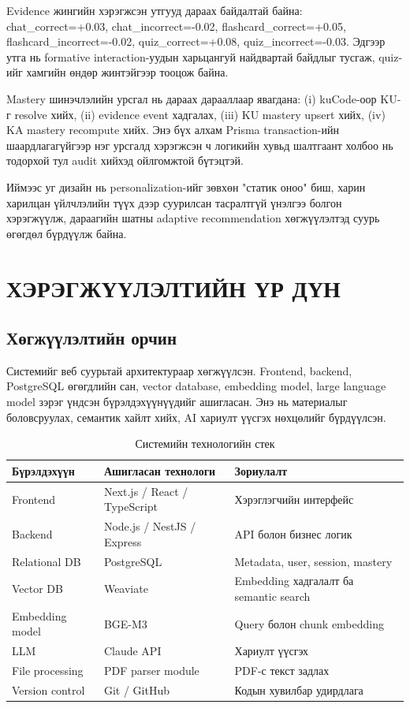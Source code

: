 \documentclass[12pt,A4]{report}
\newcommand{\eng}[1]{#1}
\begin{document}
Evidence жингийн хэрэгжсэн утгууд дараах байдалтай байна: \eng{chat\_correct}=+0.03, \eng{chat\_incorrect}=-0.02, \eng{flashcard\_correct}=+0.05, \eng{flashcard\_incorrect}=-0.02, \eng{quiz\_correct}=+0.08, \eng{quiz\_incorrect}=-0.03. Эдгээр утга нь formative interaction-уудын харьцангуй найдвартай байдлыг тусгаж, quiz-ийг хамгийн өндөр жинтэйгээр тооцож байна.

Mastery шинэчлэлийн урсгал нь дараах дарааллаар явагдана: (i) kuCode-оор KU-г resolve хийх, (ii) evidence event хадгалах, (iii) KU mastery upsert хийх, (iv) KA mastery recompute хийх. Энэ бүх алхам \eng{Prisma transaction}-ийн шаардлагагүйгээр нэг урсгалд хэрэгжсэн ч логикийн хувьд шалтгаант холбоо нь тодорхой тул audit хийхэд ойлгомжтой бүтэцтэй.

Иймээс уг дизайн нь personalization-ийг зөвхөн "статик оноо" биш, харин харилцан үйлчлэлийн түүх дээр суурилсан тасралтгүй үнэлгээ болгон хэрэгжүүлж, дараагийн шатны adaptive recommendation хөгжүүлэлтэд суурь өгөгдөл бүрдүүлж байна.


\chapter{ХЭРЭГЖҮҮЛЭЛТИЙН ҮР ДҮН}

\section{Хөгжүүлэлтийн орчин}
Системийг веб суурьтай архитектураар хөгжүүлсэн. Frontend, backend, PostgreSQL өгөгдлийн сан, vector database, embedding model, large language model зэрэг үндсэн бүрэлдэхүүнүүдийг ашигласан. Энэ нь материалыг боловсруулах, семантик хайлт хийх, AI хариулт үүсгэх нөхцөлийг бүрдүүлсэн.

\begin{table}[H]
\centering
\caption{Системийн технологийн стек}
\label{tab:tech-stack}
\begin{tabularx}{\textwidth}{>{\raggedright\arraybackslash}p{3.2cm} >{\raggedright\arraybackslash}p{5.2cm} >{\raggedright\arraybackslash}X}
\toprule
\textbf{Бүрэлдэхүүн} & \textbf{Ашигласан технологи} & \textbf{Зориулалт} \\
\midrule
Frontend & Next.js / React / TypeScript & Хэрэглэгчийн интерфейс \\
Backend & Node.js / NestJS / Express & API болон бизнес логик \\
Relational DB & PostgreSQL & Metadata, user, session, mastery \\
Vector DB & Weaviate  & Embedding хадгалалт ба semantic search \\
Embedding model & BGE-M3 & Query болон chunk embedding \\
LLM & Claude API & Хариулт үүсгэх \\
File processing & PDF parser module & PDF-с текст задлах \\
Version control & Git / GitHub & Кодын хувилбар удирдлага \\
\bottomrule
\end{tabularx}
\end{table}
\end{document}
